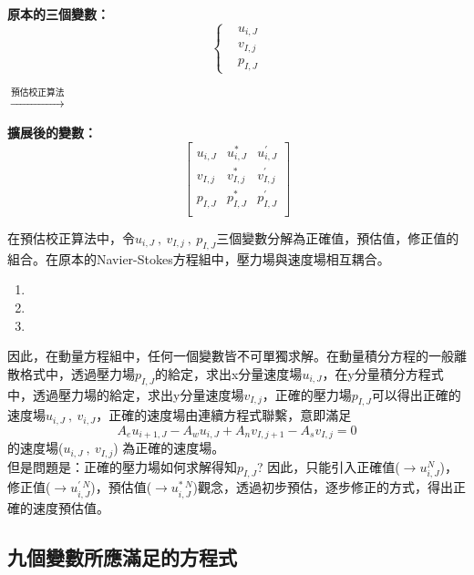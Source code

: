 \documentclass[12pt]{article}
\theoremstyle{upright}
\begin{document}
\begin{center}\begin{minipage}[c]{0.4\textwidth}
    \textbf{原本的三個變數：}
    \[
    \left\{
    \begin{aligned}
        &u_{i,J} \\[1.5ex]
        &v_{I,j} \\[1.5ex]
        &p_{I,J}
    \end{aligned}
    \right.
    \]
\end{minipage}
$\xrightarrow{\text{預估校正算法}}$
\begin{minipage}[c]{0.4\textwidth}
    \textbf{擴展後的變數：}
    \[
    \begin{bmatrix}
    u_{i,J} & u_{i,J}^{*} & u_{i,J}^{\prime} \\
    v_{I,j} & v_{I,j}^{*} & v_{I,j}^{\prime} \\
    p_{I,J} & p_{I,J}^{*} & p_{I,J}^{\prime} \\
    \end{bmatrix}
    \]
\end{minipage}\end{center}
\noindent 在預估校正算法中，令$u_{i,J}\ ,\ v_{I,j}\ ,\ p_{I,J}$三個變數分解為正確值，預估值，修正值的組合。在原本的Navier-Stokes方程組中，壓力場與速度場相互耦合。
\begin{enumerate}
    \item {}
    \item {}
    \item {}
\end{enumerate}
\noindent 因此，在動量方程組中，任何一個變數皆不可單獨求解。在動量積分方程的一般離散格式中，透過壓力場$p_{I,J}$的給定，求出x分量速度場$u_{i,J}$，在y分量積分方程式中，透過壓力場的給定，求出y分量速度場$v_{I,j}$，正確的壓力場$p_{I,J}$可以得出正確的速度場$u_{i,J}\ ,\ v_{i,J}$，正確的速度場由連續方程式聯繫，意即滿足$$A_{e}u_{i+1,J} - A_{w}u_{i,J} + A_{n}v_{I,j+1} - A_{s}v_{I,j} = 0$$的速度場($u_{i,J}\ ,\ v_{I,j}$) 為正確的速度場。\\
但是問題是：正確的壓力場如何求解得知$p_{I,J}$? 因此，只能引入正確值($\rightarrow u_{i,J}^{N}$)，修正值($\rightarrow u_{i,J}^{\prime\ N}$)，預估值($\rightarrow u_{i,J}^{*\ N}$)觀念，透過初步預估，逐步修正的方式，得出正確的速度預估值。
\subsection {九個變數所應滿足的方程式}
\end{document}
